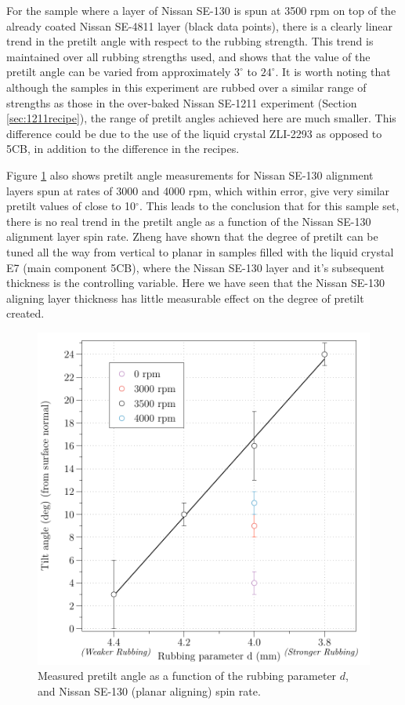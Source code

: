 For the sample where a layer of Nissan SE-130 is spun at 3500 rpm on top of the already coated Nissan SE-4811 layer (black data points), there is a clearly linear trend in the pretilt angle with respect to the rubbing strength. This trend is maintained over all rubbing strengths used, and shows that the value of the pretilt angle can be varied from approximately $3^{\circ}$ to $24^{\circ}$. It is worth noting that although the samples in this experiment are rubbed over a similar range of strengths as those in the over-baked Nissan SE-1211 experiment (Section \ref{sec:1211recipe}), the range of pretilt angles achieved here are much smaller. This difference could be due to the use of the liquid crystal ZLI-2293 as opposed to 5CB, in addition to the difference in the recipes. 

Figure \ref{fig:double_polyimide} also shows pretilt angle measurements for Nissan SE-130 alignment layers spun at rates of 3000 and 4000 rpm, which within error, give very similar pretilt values of close to 10$^{\circ}$. This leads to the conclusion that for this sample set, there is no real trend in the pretilt angle as a function of the Nissan SE-130 alignment layer spin rate. Zheng  \cite{Zheng2007} have shown that the degree of pretilt can be tuned all the way from vertical to planar in samples filled with the liquid crystal E7 (main component 5CB), where the Nissan SE-130 layer and it's subsequent thickness is the controlling variable. Here we have seen that the Nissan SE-130 aligning layer thickness has little measurable effect on the degree of pretilt created.

\begin{figure}
\begin{center}
\includegraphics{Figures/Pretilt/double_polyimide}
\end{center}
\caption[Pretilt angle as a function of rubbing parameter]{\label{fig:double_polyimide} Measured pretilt angle as a function of the rubbing parameter $d$, and Nissan SE-130 (planar aligning) spin rate.}
\end{figure}

